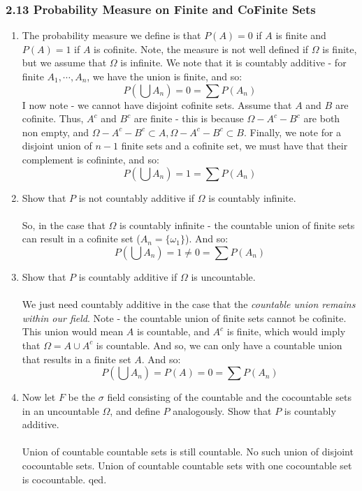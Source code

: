 \documentclass[12pt,a4paper]{article}
\newcommand{\1}[1]{\mathbbm{1}\left\{ #1 \right\}}
\begin{document}
\subsubsection{2.13 Probability Measure on Finite and CoFinite Sets}
\begin{enumerate}
	\item The probability measure we define is that $P(A) = 0$ if $A$ is finite and $P(A) = 1$ if $A$ is cofinite. Note, the measure is not well defined if $\Omega$ is finite, but we assume that $\Omega$ is infinite. We note that it is countably additive - for finite $A_1, \cdots, A_n$, we have the union is finite, and so:
	$$
		P\left(\bigcup A_n\right) = 0 = \sum P(A_n)
	$$
	I now note - we cannot have disjoint cofinite sets. Assume that $A$ and $B$ are cofinite. Thus, $A^c$ and $B^c$ are finite - this is because $\Omega - A^c - B^c$ are both non empty, and $\Omega - A^c - B^c \subset A, \Omega - A^c - B^c \subset B$. Finally, we note for a disjoint union of $n-1$ finite sets and a cofinite set, we must have that their complement is cofininte, and so:
	$$
		P\left(\bigcup A_n\right) = 1 = \sum P(A_n)
	$$
	
	\item Show that $P$ is not countably additive if $\Omega$ is countably infinite.
	\\\\
	So, in the case that $\Omega$ is countably infinite - the countable union of finite sets can result in a cofinite set ($A_n = \{\omega_1\}$). And so:
	$$
		P\left(\bigcup A_n\right) = 1 \neq 0 = \sum P(A_n)
	$$
	
	\item Show that $P$ is countably additive if $\Omega$ is uncountable.
	\\\\
	We just need countably additive in the case that the \textit{countable union remains within our field}. Note - the countable union of finite sets cannot be cofinite. This union would mean $A$ is countable, and $A^c$ is finite, which would imply that $\Omega = A \cup A^c$ is countable. And so, we can only have a countable union that results in a finite set $A$. And so:
	$$
		P\left(\bigcup A_n\right) = P(A) = 0 = \sum P(A_n)
	$$
	
	\item Now let $F$ be the $\sigma$ field consisting of the countable and the cocountable sets in an uncountable $\Omega$, and define $P$ analogously. Show that $P$ is countably additive.
	\\\\
	Union of countable countable sets is still countable. No such union of disjoint cocountable sets. Union of countable countable sets with one cocountable set is cocountable. qed.
\end{enumerate} 
\end{document}
